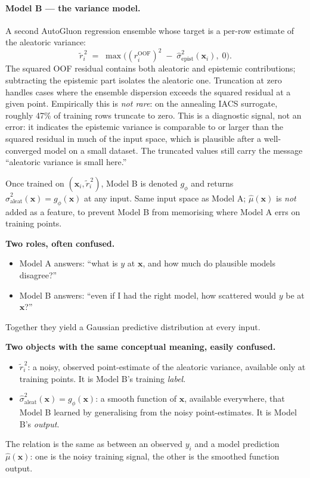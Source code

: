 \documentclass[11pt,a4paper]{article}
\begin{document}
\paragraph{Model B --- the variance model.} A second AutoGluon regression ensemble whose target is a per-row estimate of the aleatoric variance:
\begin{equation}
\tilde r_i^{\,2} \;=\; \max\!\Big( (r_i^{\text{OOF}})^2 \;-\; \hat\sigma^2_{\text{epist}}(\bm x_i),\; 0 \Big).
\label{eq:residual-correction}
\end{equation}
The squared OOF residual contains both aleatoric and epistemic contributions; subtracting the epistemic part isolates the aleatoric one. Truncation at zero handles cases where the ensemble dispersion exceeds the squared residual at a given point. Empirically this is \emph{not rare}: on the annealing IACS surrogate, roughly 47\% of training rows truncate to zero. This is a diagnostic signal, not an error: it indicates the epistemic variance is comparable to or larger than the squared residual in much of the input space, which is plausible after a well-converged model on a small dataset. The truncated values still carry the message ``aleatoric variance is small here.''

Once trained on $(\bm x_i, \tilde r_i^{\,2})$, Model B is denoted $g_\phi$ and returns $\hat\sigma^2_{\text{aleat}}(\bm x) = g_\phi(\bm x)$ at any input. Same input space as Model A; $\hat\mu(\bm x)$ is \emph{not} added as a feature, to prevent Model B from memorising where Model A errs on training points.

\begin{intuitionbox}
\textbf{Two roles, often confused.}
\begin{itemize}
    \item Model A answers: ``what is $y$ at $\bm x$, and how much do plausible models disagree?''
    \item Model B answers: ``even if I had the right model, how scattered would $y$ be at $\bm x$?''
\end{itemize}
Together they yield a Gaussian predictive distribution at every input.
\end{intuitionbox}

\begin{recapbox}
\textbf{Two objects with the same conceptual meaning, easily confused.}
\begin{itemize}
    \item $\tilde r_i^{\,2}$: a noisy, observed point-estimate of the aleatoric variance, available only at training points. It is Model B's training \emph{label}.
    \item $\hat\sigma^2_{\text{aleat}}(\bm x) = g_\phi(\bm x)$: a smooth function of $\bm x$, available everywhere, that Model B learned by generalising from the noisy point-estimates. It is Model B's \emph{output}.
\end{itemize}
The relation is the same as between an observed $y_i$ and a model prediction $\hat\mu(\bm x)$: one is the noisy training signal, the other is the smoothed function output.
\end{recapbox}
\end{document}
